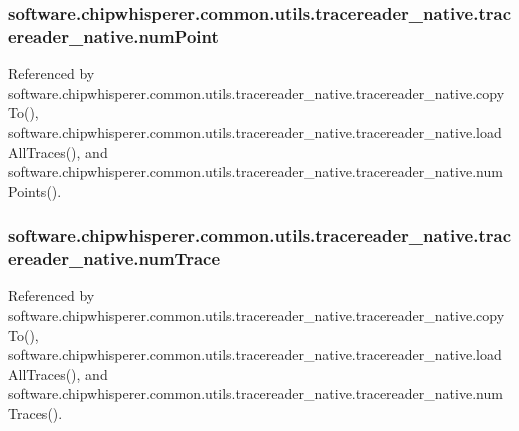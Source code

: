 \subsubsection[{num\+Point}]{\setlength{\rightskip}{0pt plus 5cm}software.\+chipwhisperer.\+common.\+utils.\+tracereader\+\_\+native.\+tracereader\+\_\+native.\+num\+Point}\label{classsoftware_1_1chipwhisperer_1_1common_1_1utils_1_1tracereader__native_1_1tracereader__native_a895e1a570e0153fa81ca4ec24225bdd8}


Referenced by software.\+chipwhisperer.\+common.\+utils.\+tracereader\+\_\+native.\+tracereader\+\_\+native.\+copy\+To(), software.\+chipwhisperer.\+common.\+utils.\+tracereader\+\_\+native.\+tracereader\+\_\+native.\+load\+All\+Traces(), and software.\+chipwhisperer.\+common.\+utils.\+tracereader\+\_\+native.\+tracereader\+\_\+native.\+num\+Points().

\hypertarget{classsoftware_1_1chipwhisperer_1_1common_1_1utils_1_1tracereader__native_1_1tracereader__native_a30ac93557a593234a5989f66f7d63950}{}
\subsubsection[{num\+Trace}]{\setlength{\rightskip}{0pt plus 5cm}software.\+chipwhisperer.\+common.\+utils.\+tracereader\+\_\+native.\+tracereader\+\_\+native.\+num\+Trace}\label{classsoftware_1_1chipwhisperer_1_1common_1_1utils_1_1tracereader__native_1_1tracereader__native_a30ac93557a593234a5989f66f7d63950}


Referenced by software.\+chipwhisperer.\+common.\+utils.\+tracereader\+\_\+native.\+tracereader\+\_\+native.\+copy\+To(), software.\+chipwhisperer.\+common.\+utils.\+tracereader\+\_\+native.\+tracereader\+\_\+native.\+load\+All\+Traces(), and software.\+chipwhisperer.\+common.\+utils.\+tracereader\+\_\+native.\+tracereader\+\_\+native.\+num\+Traces().

\hypertarget{classsoftware_1_1chipwhisperer_1_1common_1_1utils_1_1tracereader__native_1_1tracereader__native_a57f4442d5bfd86a3ec976bffab9d46f3}{}
